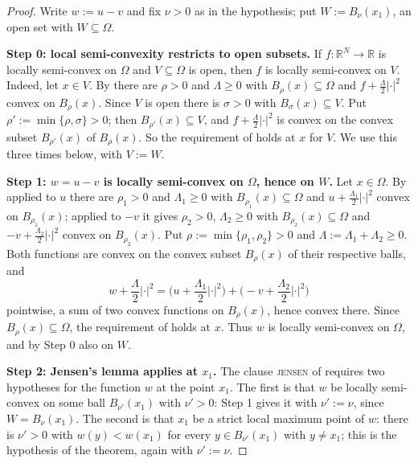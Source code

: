 \begin{proof}
Write $w:=u-v$ and fix $\nu>0$ as in the hypothesis; put $W:=B_\nu(x_1)$, an open set with
$W\subseteq\Omega$.

\medskip\noindent\textbf{Step 0: local semi-convexity restricts to open subsets.} If
$f:\mathbb R^{N}\to\mathbb R$ is locally semi-convex on $\Omega$ and $V\subseteq\Omega$ is
open, then $f$ is locally semi-convex on $V$. Indeed, let $x\in V$. By
 there are $\rho>0$ and $\Lambda\ge0$ with
$B_\rho(x)\subseteq\Omega$ and $f+\tfrac\Lambda2|\cdot|^{2}$ convex on $B_\rho(x)$. Since $V$
is open there is $\sigma>0$ with $B_\sigma(x)\subseteq V$. Put $\rho':=\min\{\rho,\sigma\}>0$;
then $B_{\rho'}(x)\subseteq V$, and $f+\tfrac\Lambda2|\cdot|^{2}$ is convex on the convex
subset $B_{\rho'}(x)$ of $B_\rho(x)$. So the requirement of 
holds at $x$ for $V$. We use this three times below, with $V:=W$.

\medskip\noindent\textbf{Step 1: $w=u-v$ is locally semi-convex on $\Omega$, hence on $W$.}
Let $x\in\Omega$. By  applied to $u$ there are $\rho_1>0$ and
$\Lambda_1\ge0$ with $B_{\rho_1}(x)\subseteq\Omega$ and
$u+\tfrac{\Lambda_1}2|\cdot|^{2}$ convex on $B_{\rho_1}(x)$; applied to $-v$ it gives
$\rho_2>0$, $\Lambda_2\ge0$ with $B_{\rho_2}(x)\subseteq\Omega$ and
$-v+\tfrac{\Lambda_2}2|\cdot|^{2}$ convex on $B_{\rho_2}(x)$. Put
$\rho:=\min\{\rho_1,\rho_2\}>0$ and $\Lambda:=\Lambda_1+\Lambda_2\ge0$. Both functions are
convex on the convex subset $B_\rho(x)$ of their respective balls, and
\[
 w+\frac\Lambda2|\cdot|^{2}
  =\Big(u+\frac{\Lambda_1}2|\cdot|^{2}\Big)+\Big(-v+\frac{\Lambda_2}2|\cdot|^{2}\Big)
\]
pointwise, a sum of two convex functions on $B_\rho(x)$, hence convex there. Since
$B_\rho(x)\subseteq\Omega$, the requirement of  holds at $x$.
Thus $w$ is locally semi-convex on $\Omega$, and by Step 0 also on $W$.

\medskip\noindent\textbf{Step 2: Jensen's lemma applies at $x_1$.} The clause
\textsc{jensen} of  requires two hypotheses for the function $w$ at the
point $x_1$. The first is that $w$ be locally semi-convex on some ball $B_{\nu'}(x_1)$ with
$\nu'>0$: Step 1 gives it with $\nu':=\nu$, since $W=B_\nu(x_1)$. The second is that $x_1$ be
a strict local maximum point of $w$: there is $\nu'>0$ with $w(y)<w(x_1)$ for every
$y\in B_{\nu'}(x_1)$ with $y\ne x_1$; this is the hypothesis of the theorem, again with
$\nu':=\nu$.


\end{proof}
